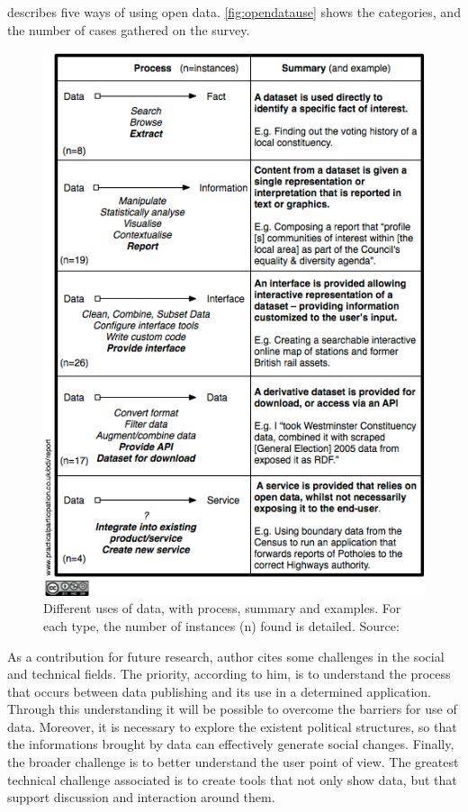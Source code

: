  describes five ways of using open data. 
\autoref{fig:opendatause} shows the categories, and the number of cases gathered on the survey.

\begin{figure}[h!]
\begin{center}
\includegraphics[scale=0.6]{images/Data-Schematic-FiveTypes}
\caption[Different uses of data, with process, summary and examples.]{Different uses of data, with process, summary and examples. For each type, the number of instances (n) found is detailed. Source: }
\label{fig:opendatause}
\end{center}
\end{figure}

As a contribution for future research, author cites some challenges in the social and technical fields.
The priority, according to him, is to understand the process that occurs between data publishing and its use in a determined application.
Through this understanding it will be possible to overcome the barriers for use of data.
Moreover, it is necessary to explore the existent political structures, so that the informations brought by data can effectively generate social changes.
Finally, the broader challenge is to better understand the user point of view.
The greatest technical challenge associated is to create tools that not only show data, but that support discussion and interaction around them.

